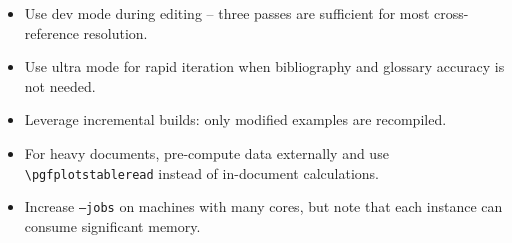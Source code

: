 \begin{itemize}
    \item Use \textsf{dev} mode during editing -- three passes are sufficient
          for most cross-reference resolution.
    \item Use \textsf{ultra} mode for rapid iteration when bibliography and
          glossary accuracy is not needed.
    \item Leverage incremental builds: only modified examples are recompiled.
    \item For  heavy documents, pre-compute data
          externally and use \texttt{\textbackslash pgfplotstableread} instead
          of in-document calculations.
    \item Increase \texttt{--jobs} on machines with many cores, but note that
          each  instance can consume significant memory.
\end{itemize}
